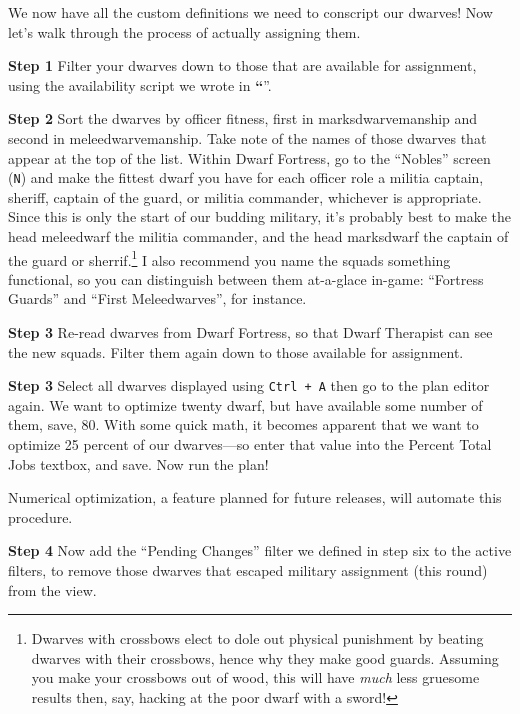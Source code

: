 \documentclass[]{article}
\newcommand{\jump}[1] {\textbf{``\nameref{sec:#1}}''}
\newcommand{\addendum}[1] {
\begin{center}
\colorbox{addendum-content}{
\begin{minipage}[t]{0.96\linewidth}
#1
\end{minipage}
}
\end{center}
}
\newcommand{\step}[1] {
\vspace{12pt}
\noindent \textbf{Step #1}
}
\begin{document}

We now have all the custom definitions we need to conscript our dwarves! Now let's walk through the
process of actually assigning them.

\step{1} Filter your dwarves down to those that are available for assignment, using the availability
script we wrote in \jump{Writing Complex Scripts}.

\step{2} Sort the dwarves by officer fitness, first in marksdwarvemanship and second in
meleedwarvemanship. Take note of the names of those dwarves that appear at the top of the list. Within
Dwarf Fortress, go to the ``Nobles'' screen (\texttt{N}) and make the fittest dwarf you have for each
officer role a militia captain, sheriff, captain of the guard, or militia commander, whichever is
appropriate. Since this is only the start of our budding military, it's probably best to make the head
meleedwarf the militia commander, and the head marksdwarf the captain of the guard or
sherrif.\footnote{Dwarves with crossbows elect to dole out physical punishment by beating dwarves with
their crossbows, hence why they make good guards. Assuming you make your crossbows out of wood, this
will have \emph{much} less gruesome results then, say, hacking at the poor dwarf with a sword!} I also
recommend you name the squads something functional, so you can distinguish between them at-a-glace
in-game: ``Fortress Guards'' and ``First Meleedwarves'', for instance.

\step{3} Re-read dwarves from Dwarf Fortress, so that Dwarf Therapist can see the new squads. Filter them
again down to those available for assignment.

\step{3} Select all dwarves displayed using \texttt{Ctrl + A} then go to the plan editor again. We want to optimize twenty dwarf, but have available some number of them, save, 80. With some quick math, it becomes apparent that we want to optimize 25 percent of our dwarves---so enter that value into the Percent Total Jobs textbox, and save. Now run the plan!

\addendum{Numerical optimization, a feature planned for future releases, will automate this procedure.}

\step{4} Now add the ``Pending Changes'' filter we defined in step six to the active filters, to remove
those dwarves that escaped military assignment (this round) from the view.
\end{document}
